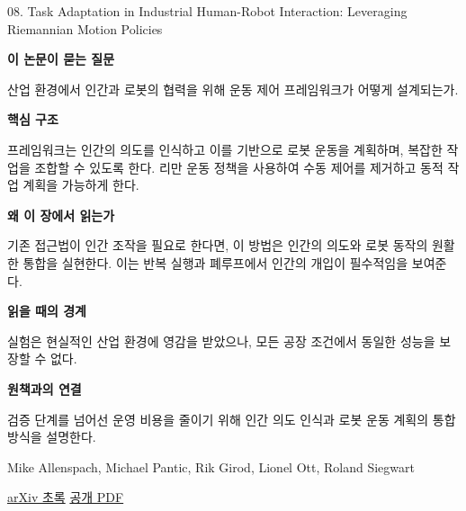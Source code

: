 \documentclass[11pt,openany]{book}
\begin{document}
\begin{termcard}{08. Task Adaptation in Industrial Human-Robot Interaction: Leveraging Riemannian Motion Policies}

\par

\medskip

{\sffamily\bfseries\color{deepblue} 이 논문이 묻는 질문}\par

산업 환경에서 인간과 로봇의 협력을 위해 운동 제어 프레임워크가 어떻게 설계되는가.

\smallskip

{\sffamily\bfseries\color{deepblue} 핵심 구조}\par

프레임워크는 인간의 의도를 인식하고 이를 기반으로 로봇 운동을 계획하며, 복잡한 작업을 조합할 수 있도록 한다. 리만 운동 정책을 사용하여 수동 제어를 제거하고 동적 작업 계획을 가능하게 한다.

\smallskip

{\sffamily\bfseries\color{deepblue} 왜 이 장에서 읽는가}\par

기존 접근법이 인간 조작을 필요로 한다면, 이 방법은 인간의 의도와 로봇 동작의 원활한 통합을 실현한다. 이는 반복 실행과 폐루프에서 인간의 개입이 필수적임을 보여준다.

\smallskip

{\sffamily\bfseries\color{coral} 읽을 때의 경계}\par

실험은 현실적인 산업 환경에 영감을 받았으나, 모든 공장 조건에서 동일한 성능을 보장할 수 없다.

\smallskip

{\sffamily\bfseries\color{teal} 원책과의 연결}\par

검증 단계를 넘어선 운영 비용을 줄이기 위해 인간 의도 인식과 로봇 운동 계획의 통합 방식을 설명한다.

\medskip

{\footnotesize\color{muted} Mike Allenspach, Michael Pantic, Rik Girod, Lionel Ott, Roland Siegwart\par

\href{https://arxiv.org/abs/2406.17333}{arXiv 초록} \quad \href{https://arxiv.org/pdf/2406.17333}{공개 PDF}\par}

\end{termcard}
\end{document}
